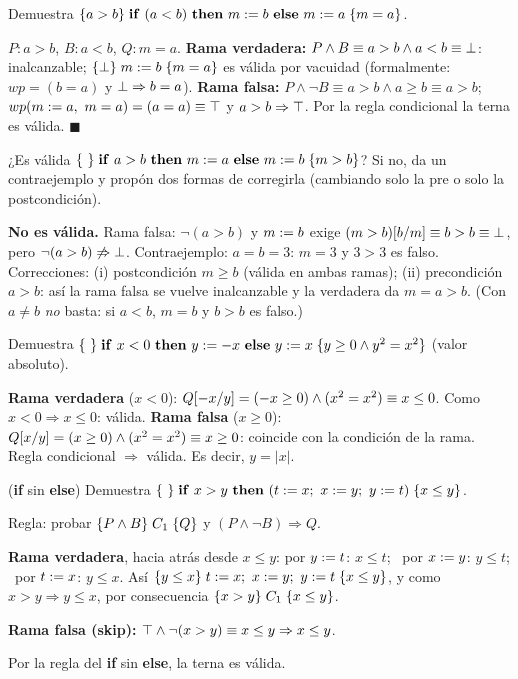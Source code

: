 \begin{prob}[\simil]
Demuestra $\hoare{a>b}{\kw{if}\ (a<b)\ \kw{then}\ m\asg b\ \kw{else}\ m\asg a}{m=a}$.
\end{prob}
\begin{sol}
$P: a>b$, $B: a<b$, $Q: m=a$.
\textbf{Rama verdadera:} $P\land B\equiv a>b\land a<b\equiv\bot$: inalcanzable; $\{\bot\}\;m\mathrel{:=} b\;\{m=a\}$ es válida por vacuidad (formalmente: $wp=(b=a)$ y $\bot\Rightarrow b=a$).
\textbf{Rama falsa:} $P\land\neg B\equiv a>b\land a\ge b\equiv a>b$; $wp(m\mathrel{:=} a,\ m=a)=(a=a)\equiv\top$ y $a>b\Rightarrow\top$.
Por la regla condicional la terna es válida. $\blacksquare$
\end{sol}

\begin{prob}
¿Es válida $\hoare{\ }{\kw{if}\ a>b\ \kw{then}\ m\asg a\ \kw{else}\ m\asg b}{m>b}$? Si no, da un contraejemplo y propón dos formas de corregirla (cambiando solo la pre o solo la postcondición).
\end{prob}
\begin{sol}
\textbf{No es válida.} Rama falsa: $\neg(a>b)$ y $m\mathrel{:=} b$ exige $(m>b)[b/m]\equiv b>b\equiv\bot$, pero $\neg(a>b)\not\Rightarrow\bot$. Contraejemplo: $a=b=3$: $m=3$ y $3>3$ es falso.
Correcciones: (i) postcondición $m\ge b$ (válida en ambas ramas); (ii) precondición $a>b$: así la rama falsa se vuelve inalcanzable y la verdadera da $m=a>b$. (Con $a\neq b$ \emph{no} basta: si $a<b$, $m=b$ y $b>b$ es falso.)
\end{sol}

\begin{prob}
Demuestra $\hoare{\ }{\kw{if}\ x<0\ \kw{then}\ y\asg -x\ \kw{else}\ y\asg x}{y\ge0\land y^2=x^2}$ (valor absoluto).
\end{prob}
\begin{sol}
\textbf{Rama verdadera} ($x<0$): $Q[-x/y]=(-x\ge0)\land(x^2=x^2)\equiv x\le0$. Como $x<0\Rightarrow x\le0$: válida.
\textbf{Rama falsa} ($x\ge0$): $Q[x/y]=(x\ge0)\land(x^2=x^2)\equiv x\ge0$: coincide con la condición de la rama.
Regla condicional $\Rightarrow$ válida. Es decir, $y=|x|$.
\end{sol}

\begin{prob}
(\textbf{if} sin \textbf{else}) Demuestra $\hoare{\ }{\kw{if}\ x>y\ \kw{then}\ (t\asg x;\ x\asg y;\ y\asg t)}{x\le y}$.
\end{prob}
\begin{sol}
Regla: probar $\{P\land B\}\;C_1\;\{Q\}$ y $(P\land\neg B)\Rightarrow Q$.

\textbf{Rama verdadera}, hacia atrás desde $x\le y$:
por $y\mathrel{:=} t$: $x\le t$; \ por $x\mathrel{:=} y$: $y\le t$; \ por $t\mathrel{:=} x$: $y\le x$. Así $\{y\le x\}\;t\mathrel{:=} x;\ x\mathrel{:=} y;\ y\mathrel{:=} t\;\{x\le y\}$, y como $x>y\Rightarrow y\le x$, por consecuencia $\{x>y\}\;C_1\;\{x\le y\}$.

\textbf{Rama falsa (skip):} $\top\land\neg(x>y)\equiv x\le y\Rightarrow x\le y$. \checkmark

Por la regla del \textbf{if} sin \textbf{else}, la terna es válida.
\end{sol}

